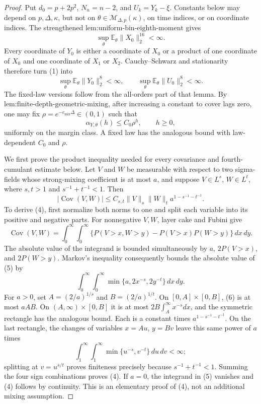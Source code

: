 \documentclass{article}
\begin{document}
\begin{proof}
Put \(d_0=p+2p^2\), \(N_n=n-2\), and \(U_k=Y_k-\xi\).  Constants below may depend on \(p,\Delta,\kappa\), but not on \(\theta\in\mathcal M_{\Delta,p}(\kappa)\), on time indices, or on coordinate indices.  The strengthened \(\text{lem:uniform-bin-eighth-moment}\) gives
\[
 \sup_\theta\mathbb E_\theta\lVert X_0\rVert_2^{16}<\infty.
\tag{1}
\]
Every coordinate of \(Y_0\) is either a coordinate of \(X_0\) or a product of one coordinate of \(X_0\) and one coordinate of \(X_1\) or \(X_2\).  Cauchy--Schwarz and stationarity therefore turn (1) into
\[
 \sup_\theta\mathbb E_\theta\lVert Y_0\rVert_2^8<\infty,
 \qquad
 \sup_\theta\mathbb E_\theta\lVert U_0\rVert_2^8<\infty.
\tag{2}
\]
The fixed-law versions follow from the all-orders part of that lemma.  By \(\text{lem:finite-depth-geometric-mixing}\), after increasing a constant to cover lags zero, one may fix \(\rho=e^{-c_{\mathrm{mix}}\Delta}\in(0,1)\) such that
\[
 \alpha_{Y,\theta}(h)\leq C_0\rho^h,
 \qquad h\geq0,
\tag{3}
\]
uniformly on the margin class.  A fixed law has the analogous bound with law-dependent \(C_0\) and \(\rho\).

We first prove the product inequality needed for every covariance and fourth-cumulant estimate below.  Let \(V\) and \(W\) be measurable with respect to two sigma-fields whose strong-mixing coefficient is at most \(a\), and suppose \(V\in L^s\), \(W\in L^t\), where \(s,t>1\) and \(s^{-1}+t^{-1}<1\).  Then
\[
 |\operatorname{Cov}(V,W)|
 \leq C_{s,t}\lVert V\rVert_s\lVert W\rVert_t
 a^{1-s^{-1}-t^{-1}}.
\tag{4}
\]
To derive (4), first normalize both norms to one and split each variable into its positive and negative parts.  For nonnegative \(V,W\), layer cake and Fubini give
\[
 \operatorname{Cov}(V,W)=
 \int_0^\infty\!\int_0^\infty
 \{P(V>x,W>y)-P(V>x)P(W>y)\}\,dx\,dy.
\tag{5}
\]
The absolute value of the integrand is bounded simultaneously by \(a\), \(2P(V>x)\), and \(2P(W>y)\).  Markov's inequality consequently bounds the absolute value of (5) by
\[
 \int_0^\infty\!\int_0^\infty
 \min\{a,2x^{-s},2y^{-t}\}\,dx\,dy.
\tag{6}
\]
For \(a>0\), set \(A=(2/a)^{1/s}\) and \(B=(2/a)^{1/t}\).  On \([0,A]\times[0,B]\), (6) is at most \(aAB\).  On \((A,\infty)\times[0,B]\) it is at most \(2B\int_A^\infty x^{-s}dx\), and the symmetric rectangle has the analogous bound.  Each is a constant times \(a^{1-s^{-1}-t^{-1}}\).  On the last rectangle, the changes of variables \(x=Au\), \(y=Bv\) leave this same power of \(a\) times
\[
 \int_1^\infty\!\int_1^\infty\min\{u^{-s},v^{-t}\}\,du\,dv<\infty;
\tag{7}
\]
splitting at \(v=u^{s/t}\) proves finiteness precisely because \(s^{-1}+t^{-1}<1\).  Summing the four sign combinations proves (4).  If \(a=0\), the integrand in (5) vanishes and (4) follows by continuity.  This is an elementary proof of (4), not an additional mixing assumption.


\end{proof}
\end{document}
